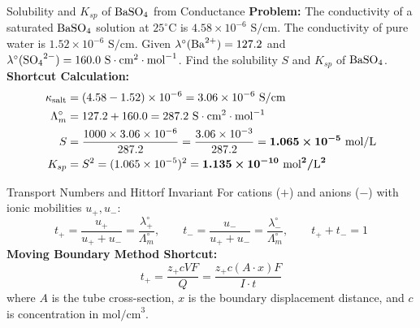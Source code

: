 \documentclass[11pt,a4paper]{report}
\newcommand{\ans}[1]{\ifmmode\bm{#1}\else\textbf{#1}\fi}
\begin{document}
\begin{microbox}{Solubility and $K_{sp}$ of $\ce{BaSO4}$ from Conductance}
\textbf{Problem:} The conductivity of a saturated $\ce{BaSO4}$ solution at $25^\circ\text{C}$ is $4.58 \times 10^{-6}\text{ S/cm}$. The conductivity of pure water is $1.52 \times 10^{-6}\text{ S/cm}$. Given $\lambda^\circ(\ce{Ba^{2+}}) = 127.2$ and $\lambda^\circ(\ce{SO4^{2-}}) = 160.0\text{ S}\cdot\text{cm}^2\cdot\text{mol}^{-1}$. Find the solubility $S$ and $K_{sp}$ of $\ce{BaSO4}$.\\
\textbf{Shortcut Calculation:}
\begin{align*}
\kappa_{\rm salt} &= (4.58 - 1.52) \times 10^{-6} = 3.06 \times 10^{-6}\text{ S/cm} \\
\Lambda_m^\circ &= 127.2 + 160.0 = 287.2\text{ S}\cdot\text{cm}^2\cdot\text{mol}^{-1} \\
S &= \frac{1000 \times 3.06 \times 10^{-6}}{287.2} = \frac{3.06 \times 10^{-3}}{287.2} = \ans{1.065 \times 10^{-5}\text{ mol/L}} \\
K_{sp} &= S^2 = (1.065 \times 10^{-5})^2 = \ans{1.135 \times 10^{-10}\text{ mol}^2/\text{L}^2}
\end{align*}
\end{microbox}

\begin{shortcutbox}{Transport Numbers and Hittorf Invariant}
For cations ($+$) and anions ($-$) with ionic mobilities $u_+, u_-$:
\begin{equation}
\boxed{
t_+ = \frac{u_+}{u_+ + u_-} = \frac{\lambda_+^\circ}{\Lambda_m^\circ}, \qquad t_- = \frac{u_-}{u_+ + u_-} = \frac{\lambda_-^\circ}{\Lambda_m^\circ}, \qquad t_+ + t_- = 1
}
\end{equation}
\textbf{Moving Boundary Method Shortcut:}
\begin{equation}
\boxed{
t_+ = \frac{z_+ c V F}{Q} = \frac{z_+ c (A \cdot x) F}{I \cdot t}
}
\end{equation}
where $A$ is the tube cross-section, $x$ is the boundary displacement distance, and $c$ is concentration in $\text{mol/cm}^3$.
\end{shortcutbox}
\end{document}
